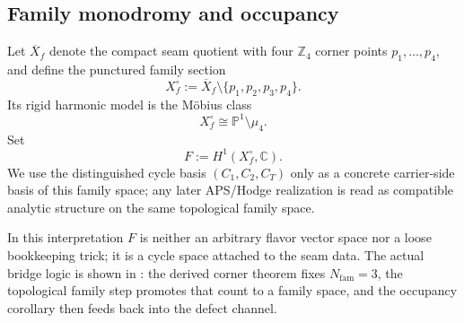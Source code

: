 \subsection{Family monodromy and occupancy}

\begin{definition}
Let $\overline X_f$ denote the compact seam quotient with four $\mathbb Z_4$ corner points
$p_1,\dots,p_4$, and define the punctured family section
\[
X_f^\circ:=\overline X_f\setminus\{p_1,p_2,p_3,p_4\}.
\]
Its rigid harmonic model is the Möbius class
\[
X_f^\circ\cong \mathbb P^1\setminus\mu_4.
\]
Set
\[
F:=H^1(X_f^\circ,\mathbb C).
\]
We use the distinguished cycle basis $(C_1,C_2,C_T)$ only as a concrete carrier-side basis of this family space; any later APS/Hodge realization is read as compatible analytic structure on the same topological family space.
\end{definition}
In this interpretation $F$ is neither an arbitrary flavor vector space nor a loose bookkeeping
trick; it is a cycle space attached to the seam data. The actual bridge logic is shown in
: the derived corner theorem fixes $N_{\mathrm{fam}}=3$, the
topological family step promotes that count to a family space, and the occupancy corollary then
feeds back into the defect channel.

